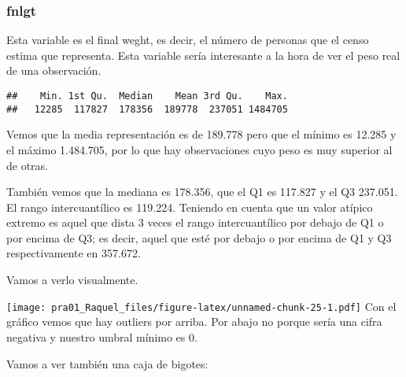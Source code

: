 \documentclass[]{article}
\newenvironment{Shaded}{\begin{snugshade}}{\end{snugshade}}
\newcommand{\DataTypeTok}[1]{\textcolor[rgb]{0.87,0.87,0.75}{#1}}
\newcommand{\FloatTok}[1]{\textcolor[rgb]{0.75,0.75,0.82}{#1}}
\newcommand{\KeywordTok}[1]{\textcolor[rgb]{0.94,0.87,0.69}{#1}}
\newcommand{\NormalTok}[1]{\textcolor[rgb]{0.80,0.80,0.80}{#1}}
\newcommand{\OperatorTok}[1]{\textcolor[rgb]{0.94,0.94,0.82}{#1}}
\newcommand{\StringTok}[1]{\textcolor[rgb]{0.80,0.58,0.58}{#1}}
\begin{document}
\hypertarget{fnlgt}{%
\subsubsection{fnlgt}\label{fnlgt}}

Esta variable es el final weght, es decir, el número de personas que el
censo estima que representa. Esta variable sería interesante a la hora
de ver el peso real de una observación.

\begin{Shaded}
\end{Shaded}

\begin{verbatim}
##    Min. 1st Qu.  Median    Mean 3rd Qu.    Max. 
##   12285  117827  178356  189778  237051 1484705
\end{verbatim}

Vemos que la media representación es de 189.778 pero que el mínimo es
12.285 y el máximo 1.484.705, por lo que hay observaciones cuyo peso es
muy superior al de otras.

También vemos que la mediana es 178.356, que el Q1 es 117.827 y el Q3
237.051. El rango intercuantílico es 119.224. Teniendo en cuenta que un
valor atípico extremo es aquel que dista 3 veces el rango
intercuantílico por debajo de Q1 o por encima de Q3; es decir, aquel que
esté por debajo o por encima de Q1 y Q3 respectivamente en 357.672.

Vamos a verlo visualmente.

\begin{Shaded}
\end{Shaded}

\texttt{[image: pra01\_Raquel\_files/figure-latex/unnamed-chunk-25-1.pdf]}
Con el gráfico vemos que hay outliers por arriba. Por abajo no porque
sería una cifra negativa y nuestro umbral mínimo es 0.

Vamos a ver también una caja de bigotes:

\begin{Shaded}
\end{Shaded}
\end{document}
